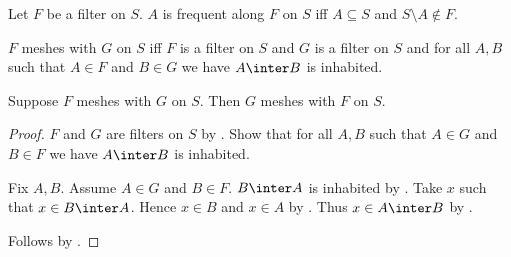 \begin{definition}\label{filter_frequent}
    Let $F$ be a filter on $S$.
    $A$ is frequent along $F$ on $S$ iff
        $A\subseteq S$ and $S\setminus A\notin F$.
\end{definition}

\begin{definition}\label{filters_mesh}
    $F$ meshes with $G$ on $S$ iff
        $F$ is a filter on $S$ and $G$ is a filter on $S$ and
        for all $A,B$ such that $A\in F$ and $B\in G$
            we have $A\inter B$ is inhabited.
\end{definition}

\begin{proposition}\label{filters_mesh_symmetric}
    Suppose $F$ meshes with $G$ on $S$.
    Then $G$ meshes with $F$ on $S$.
\end{proposition}
\begin{proof}
    $F$ and $G$ are filters on $S$ by .
    Show that for all $A,B$ such that $A\in G$ and $B\in F$
        we have $A\inter B$ is inhabited.
    \begin{subproof}
        Fix $A,B$.
        Assume $A\in G$ and $B\in F$.
        $B\inter A$ is inhabited by .
        Take $x$ such that $x\in B\inter A$.
        Hence $x\in B$ and $x\in A$ by .
        Thus $x\in A\inter B$ by .
    \end{subproof}
    Follows by .
\end{proof}

